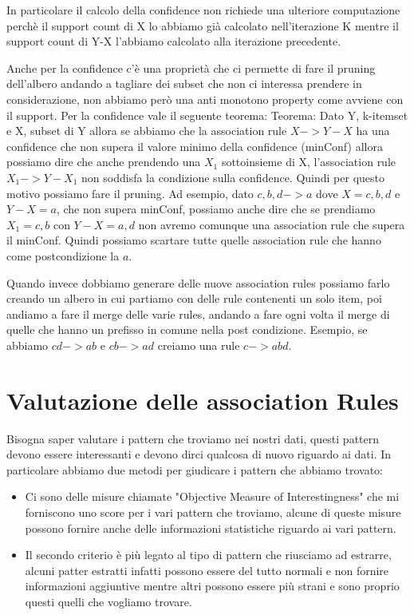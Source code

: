 \documentclass[14pt]{extreport}
\begin{document}
In particolare il calcolo della confidence non richiede una ulteriore computazione perchè il support count di X lo abbiamo già calcolato nell'iterazione K mentre il support count di Y-X l'abbiamo calcolato alla iterazione precedente.

Anche per la confidence c'è una proprietà che ci permette di fare il pruning dell'albero andando a tagliare dei subset che non ci interessa prendere in considerazione, non abbiamo però una anti monotono property come avviene con il support.
Per la confidence vale il seguente teorema:
\newline
Teorema: Dato Y, k-itemset e X, subset di Y allora se abbiamo che la association rule $X->Y-X$ ha una confidence che non supera il valore minimo della confidence (minConf) allora possiamo dire che anche prendendo una $X_1$ sottoinsieme di X, l'association rule $X_1->Y-X_1$ non soddisfa la condizione sulla confidence. Quindi per questo motivo possiamo fare il pruning. Ad esempio, dato ${c,b,d}->{a}$ dove $X={c,b,d}$ e $Y-X = {a}$, che non supera minConf, possiamo anche dire che se prendiamo $X_1 = {c,b}$ con $Y-X = {a,d}$ non avremo comunque una association rule che supera il minConf. Quindi possiamo scartare tutte quelle association rule che hanno come postcondizione la ${a}$.

Quando invece dobbiamo generare delle nuove association rules possiamo farlo creando un albero in cui partiamo con delle rule contenenti un solo item, poi andiamo a fare il merge delle varie rules, andando a fare ogni volta il merge di quelle che hanno un prefisso in comune nella post condizione. Esempio, se abbiamo ${cd}->{ab}$ e ${cb}->{ad}$ creiamo una rule ${c}->{abd}$.

\section{Valutazione delle association Rules}

Bisogna saper valutare i pattern che troviamo nei nostri dati, questi pattern devono essere interessanti e devono dirci qualcosa di nuovo riguardo ai dati.
In particolare abbiamo due metodi per giudicare i pattern che abbiamo trovato:

\begin{itemize}
    \item Ci sono delle misure chiamate "Objective Measure of Interestingness" che mi forniscono uno score per i vari pattern che troviamo, alcune di queste misure possono fornire anche delle informazioni statistiche riguardo ai vari pattern.
    \item Il secondo criterio è più legato al tipo di pattern che riusciamo ad estrarre, alcuni patter estratti infatti possono essere del tutto normali e non fornire informazioni aggiuntive mentre altri possono essere più strani e sono proprio questi quelli che vogliamo trovare.
\end{itemize}
\end{document}

